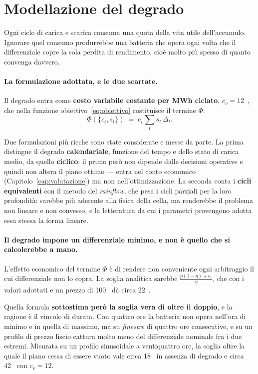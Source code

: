 \section{Modellazione del degrado}
\label{sec:degrado}

Ogni ciclo di carica e scarica consuma una quota della vita utile dell'accumulo. Ignorare quel
consumo produrrebbe una batteria che opera ogni volta che il differenziale copre la sola
perdita di rendimento, cio\`e molto pi\`u spesso di quanto convenga davvero.

\paragraph{La formulazione adottata, e le due scartate.} Il degrado entra come \textbf{costo
variabile costante per MWh ciclato}, $c_v = 12$~\euromwh{}, che nella funzione
obiettivo~\eqref{eq:obiettivo} costituisce il termine $\Phi$:
\begin{equation}
\Phi\!\left(\{c_t, s_t\}\right) \;=\; c_v \sum_{t} s_t \, \Delta_t .
\label{eq:degrado}
\end{equation}

Due formulazioni pi\`u ricche sono state considerate e messe da parte. La prima distingue il
degrado \textbf{calendariale}, funzione del tempo e dello stato di carica medio, da quello
\textbf{ciclico}: il primo per\`o non dipende dalle decisioni operative e quindi non altera il
piano ottimo --- entra nel conto economico (Capitolo~\ref{cap:valutazione}) ma non
nell'ottimizzazione. La seconda conta i \textbf{cicli equivalenti} con il metodo del
\emph{rainflow}, che pesa i cicli parziali per la loro profondit\`a: sarebbe pi\`u aderente
alla fisica della cella, ma renderebbe il problema non lineare e non convesso, e la
letteratura da cui i parametri provengono adotta essa stessa la forma lineare.

\paragraph{Il degrado impone un differenziale minimo, e non \`e quello che si calcolerebbe a
mano.} L'effetto economico del termine $\Phi$ \`e di rendere non conveniente ogni arbitraggio
il cui differenziale non lo copra. La soglia analitica sarebbe
$\frac{p(1-\eta) + c_v}{\eta}$, che con i valori adottati e un prezzo di 100~\euromwh{} d\`a
circa 22~\euromwh{}.

Quella formula \textbf{sottostima per\`o la soglia vera di oltre il doppio}, e la ragione \`e
il vincolo di durata. Con quattro ore la batteria non opera nell'ora di minimo e in quella di
massimo, ma su \emph{finestre} di quattro ore consecutive, e su un profilo di prezzo liscio
cattura molto meno del differenziale nominale fra i due estremi. Misurata su un profilo
sinusoidale a ventiquattro ore, la soglia oltre la quale il piano cessa di essere vuoto vale
circa 18~\euromwh{} in assenza di degrado e circa 42~\euromwh{} con $c_v = 12$.

